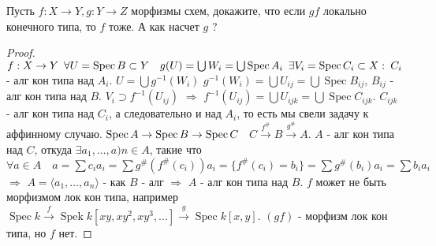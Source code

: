 \begin{prob}
Пусть $f: X \rightarrow Y, g: Y \rightarrow Z$ морфизмы схем, докажите, что если $g f$ локально конечного типа, то $f$ тоже. А как насчет $g$ ?
\end{prob}
\begin{proof}
$f: X \to Y\hspace{0.5em} \forall U = \operatorname{Spec} B \subset Y\hspace{1em} g(U) = \bigcup W_i = \bigcup \operatorname{Spec} A_i\hspace{0.5em} \exists V_i = \operatorname{Spec} C_i \subset X:\hspace{0.25em} C_i$ - алг кон типа над $A_i$. $U = \bigcup g^{-1} (W_i)$ $g^{-1}(W_i) = \bigcup U_{ij} = \bigcup \operatorname{Spec} B_{ij}$, $B_{ij}$ - алг кон типа над $B$. $V_i \supset f^{-1} (U_{ij})$ $\Rightarrow$ $f^{-1} (U_{ij}) = \bigcup U_{ijk} = \bigcup \operatorname{Spec} C_{ijk}$. $C_{ijk}$ - алг кон типа над $C_i$, а следовательно и над $A_i$, то есть мы свели задачу к аффинному случаю. $\operatorname{Spec} A \rightarrow \operatorname{Spec} B \rightarrow \operatorname{Spec} C\hspace{0.5em}$ $C \xrightarrow{f^{\#}} B \xrightarrow{g^{\#}} A$. $A$ - алг кон типа над $C$, откуда $\exists a_1, \ldots, a)n \in A$, такие что $\forall a \in A\hspace{1em} a = \sum c_i a_i = \sum g^{\#}(f^{\#}(c_i)) a_i = \{f^{\#}(c_i) = b_i\} = \sum g^{\#}(b_i) a_i = \sum b_i a_i$ $\Rightarrow$ $A = \langle a_1, \ldots, a_n \rangle$ - как $B$ - алг $\Rightarrow$ $A$ - алг кон типа над $B$. $f$ может не быть морфизмом лок кон типа, например $\operatorname{Spec} k \xrightarrow{f} \operatorname{Spek} k [xy, xy^2, xy^3, \ldots] \xrightarrow{g} \operatorname{Spec} k[x,y]$. $(gf)$ - морфизм лок кон типа, но $f$ нет.
\end{proof}
\begin{comment}
\end{comment}
\vskip 0.6in





